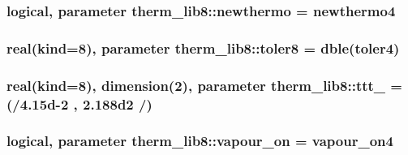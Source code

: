 \subsubsection[{\texorpdfstring{newthermo}{newthermo}}]{\setlength{\rightskip}{0pt plus 5cm}logical, parameter therm\+\_\+lib8\+::newthermo = newthermo4}\hypertarget{namespacetherm__lib8_acf7c73667b035fd1eb6ab1d3924e941e}{}\label{namespacetherm__lib8_acf7c73667b035fd1eb6ab1d3924e941e}
\subsubsection[{\texorpdfstring{toler8}{toler8}}]{\setlength{\rightskip}{0pt plus 5cm}real(kind=8), parameter therm\+\_\+lib8\+::toler8 = dble(toler4)}\hypertarget{namespacetherm__lib8_a8b637ec830ea211fe50a2365a9a5d1e2}{}\label{namespacetherm__lib8_a8b637ec830ea211fe50a2365a9a5d1e2}
\subsubsection[{\texorpdfstring{ttt\+\_\+108}{ttt_108}}]{\setlength{\rightskip}{0pt plus 5cm}real(kind=8), dimension(2), parameter therm\+\_\+lib8\+::ttt\+\_ = (/4.\+15d-\/2 , 2.\+188d2 /)}\hypertarget{namespacetherm__lib8_a5879d4524f2706a75384614d311d91c7}{}\label{namespacetherm__lib8_a5879d4524f2706a75384614d311d91c7}
\subsubsection[{\texorpdfstring{vapour\+\_\+on}{vapour_on}}]{\setlength{\rightskip}{0pt plus 5cm}logical, parameter therm\+\_\+lib8\+::vapour\+\_\+on = vapour\+\_\+on4}\hypertarget{namespacetherm__lib8_a8dcf3ae8ee8dc104aaded77571f2be33}{}\label{namespacetherm__lib8_a8dcf3ae8ee8dc104aaded77571f2be33}

